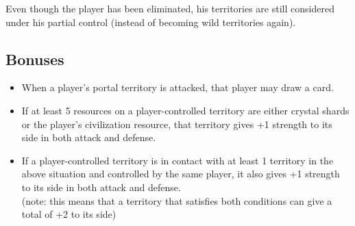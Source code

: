 \documentclass[a4paper]{article}
\begin{document}
        Even though the player has been eliminated,
        his territories are still considered under his partial control
        (instead of becoming wild territories again).
        
    \subsection{Bonuses}
        \begin{itemize}
            \item When a player's portal territory is attacked,
                that player may draw a card.
            \item If at least 5 resources on a player-controlled territory are either
                crystal shards or the player's civilization resource,
                that territory gives +1 strength to its side in both attack and defense.
            \item If a player-controlled territory is in contact with at least 1 territory
                in the above situation and controlled by the same player,
                it also gives +1 strength to its side in both attack and defense.\\
                (note: this means that a territory that satisfies both conditions
                can give a total of +2 to its side)
        \end{itemize}
        
\newpage
\end{document}
